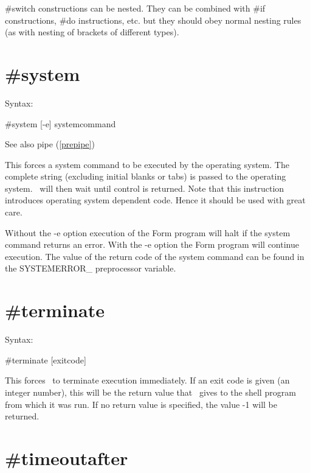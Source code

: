 \#switch constructions can be nested. They can be combined 
with \#if constructions, \#do instructions, etc. 
but they should obey normal nesting rules (as with nesting of 
brackets of different types).

 
\section{\#system}
\label{presystem}

\noindent Syntax:

\#system [-e] systemcommand
 
\noindent See also pipe (\ref{prepipe})

\noindent This forces a system command to be executed by 
the operating system. The complete string (excluding initial blanks or 
tabs) is passed to the operating system. \FORM\ will then wait until control 
is returned. Note that this instruction introduces operating system 
dependent code. Hence it should be used with great care.

\noindent Without the -e option execution of the Form program will halt if 
the system command returns an error. With the -e option the Form program 
will continue execution. The value of the return code of the system command 
can be found in the SYSTEMERROR\_ preprocessor variable.

 
\section{\#terminate}
\label{preterminate}

\noindent Syntax:

\#terminate [exitcode]
 
\noindent This forces \FORM\ to terminate execution 
immediately. If an exit code is given (an integer number), this will be the 
return value that \FORM\ gives to the shell program from which it was run. If 
no return value is specified, the value -1 will be returned.

 
\section{\#timeoutafter}
\label{pretimeoutafter}

